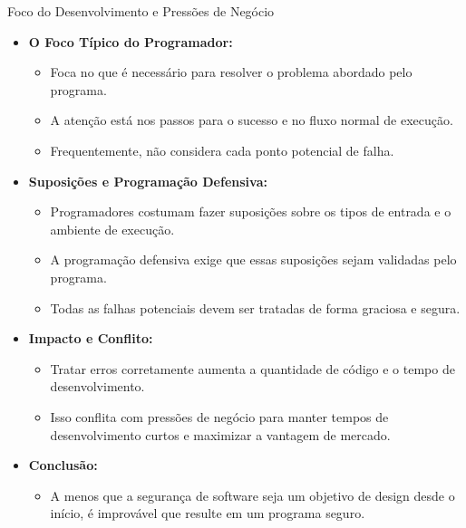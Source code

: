 \begin{frame}{Foco do Desenvolvimento e Pressões de Negócio}
    \begin{itemize}
        \item \textbf{O Foco Típico do Programador:}
              \begin{itemize}
                  \item Foca no que é necessário para resolver o problema abordado pelo programa.
                  \item A atenção está nos passos para o sucesso e no fluxo normal de execução.
                  \item Frequentemente, não considera cada ponto potencial de falha.
              \end{itemize}

        \item \textbf{Suposições e Programação Defensiva:}
              \begin{itemize}
                  \item Programadores costumam fazer suposições sobre os tipos de entrada e o ambiente de execução.
                  \item A programação defensiva exige que essas suposições sejam validadas pelo programa.
                  \item Todas as falhas potenciais devem ser tratadas de forma graciosa e segura.
              \end{itemize}

        \item \textbf{Impacto e Conflito:}
              \begin{itemize}
                  \item Tratar erros corretamente aumenta a quantidade de código e o tempo de desenvolvimento.
                  \item Isso conflita com pressões de negócio para manter tempos de desenvolvimento curtos e maximizar a vantagem de mercado.
              \end{itemize}

        \item \textbf{Conclusão:}
              \begin{itemize}
                  \item A menos que a segurança de software seja um objetivo de design desde o início, é improvável que resulte em um programa seguro.
              \end{itemize}
    \end{itemize}
\end{frame}

